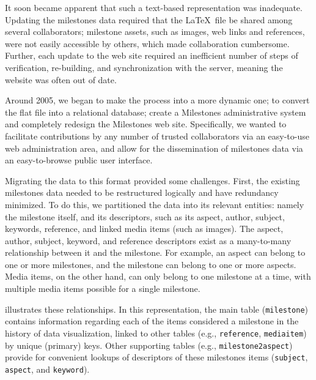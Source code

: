 It soon became apparent that such a text-based representation was inadequate. 
Updating the milestones data required that the \LaTeX\ file be shared among 
several collaborators; milestone assets, such as images, web links and 
references, were not easily accessible by others, which made collaboration 
cumbersome. 
Further, each update to the web site required an inefficient number 
of steps of verification, re-building, and synchronization with the server, 
meaning the website was often out of date.

Around 2005, we began to make the process into a more dynamic one; to convert 
the flat file into a relational database; create a Milestones administrative 
system and completely redesign the Milestones web site. 
Specifically, we wanted 
to facilitate contributions by any number of trusted collaborators via an 
easy-to-use web administration area, and allow for the dissemination of 
milestones data via an easy-to-browse public user interface.

Migrating the data to this format provided some challenges. 
First, the existing 
milestones data needed to be restructured logically
 and have redundancy minimized. 
To do this, we partitioned the data into its relevant entities: namely the 
milestone itself, and its descriptors, such as its aspect, author, subject, 
keywords, reference, and linked media items (such as images). 
The aspect, 
author, subject, keyword, and reference descriptors exist as a many-to-many 
relationship between it and the milestone. 
For example, an aspect can belong to 
one or more milestones, and the milestone can belong to one or more aspects. 
Media items, on the other hand, can only belong to one milestone at a time, 
with multiple media items possible for a single milestone. 

 illustrates these relationships.  
In this representation, the main table (\texttt{milestone}) contains information regarding each of the items considered a 
milestone in the history of data visualization, linked to other tables (e.g., \texttt{reference}, \texttt{mediaitem}) by unique (primary) keys.  
Other supporting tables (e.g., \texttt{milestone2aspect}) provide for convenient lookups of 
descriptors of these milestones items (\texttt{subject}, \texttt{aspect}, and \texttt{keyword}).

